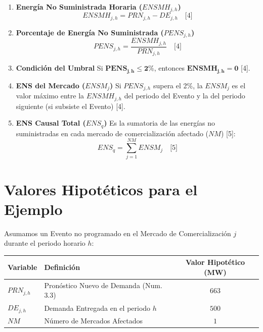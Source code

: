 \documentclass[a5paper]{book}%
\begin{document}
\begin{enumerate}
	\item \textbf{Energía No Suministrada Horaria ($ENSMH_{j,h}$)}
	\begin{equation}
		ENSMH_{j,h} = PRN_{j,h} - DE_{j,h} \quad \text{[4]}
	\end{equation}
	
	\item \textbf{Porcentaje de Energía No Suministrada ($PENS_{j,h}$)}
	\begin{equation}
		PENS_{j,h} = \frac{ENSMH_{j,h}}{PRN_{j,h}} \quad \text{[4]}
	\end{equation}
	
	\item \textbf{Condición del Umbral}
	Si $\mathbf{PENS_{j,h} \le 2\%}$, entonces $\mathbf{ENSMH_{j,h} = 0}$ [4].
	
	\item \textbf{ENS del Mercado ($ENSM_j$)}
	Si $PENS_{j,h}$ supera el 2\%, la $ENSM_j$ es el valor máximo entre la $ENSMH_{j,h}$ del periodo del Evento y la del periodo siguiente (si subsiste el Evento) [4].
	
	\item \textbf{ENS Causal Total ($ENS_q$)}
	Es la sumatoria de las energías no suministradas en cada mercado de comercialización afectado ($NM$) [5]:
	\begin{equation}
		ENS_q = \sum_{j=1}^{NM} ENSM_j \quad \text{[5]}
	\end{equation}
\end{enumerate}

\section*{Valores Hipotéticos para el Ejemplo}

Asumamos un Evento no programado en el Mercado de Comercialización $j$ durante el periodo horario $h$:

\begin{center}
	\begin{tabular}{|l|l|c|}
		\hline
		\textbf{Variable} & \textbf{Definición} & \textbf{Valor Hipotético (MW)} \\
		\hline
		$PRN_{j,h}$ & Pronóstico Nuevo de Demanda (Num. 3.3) & $663$ \\
		$DE_{j,h}$ & Demanda Entregada en el periodo $h$ & $500$ \\
		$NM$ & Número de Mercados Afectados & $1$ \\
		\hline
	\end{tabular}
\end{center}
\end{document}
